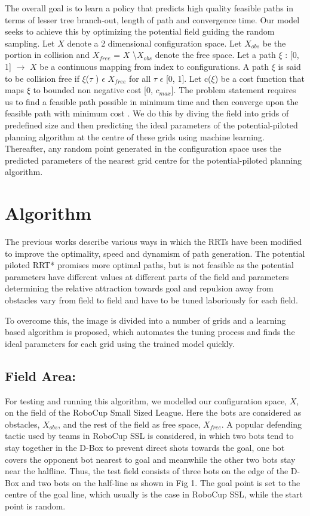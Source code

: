 \documentclass[runningheads]{llncs}
\begin{document}
The overall goal is to learn a policy that predicts high quality feasible paths in terms of lesser tree branch-out, length of path and convergence time. Our model seeks to achieve this by optimizing the potential field guiding the random sampling. Let $X$ denote a 2 dimensional configuration space. Let
$X_{obs}$ be the portion in collision and $X_{free}$ = $X$ \textbackslash $X_{obs}$ denote
the free space. Let a path {$\xi$} : [0, 1] {$\rightarrow$} $X$ be a continuous mapping from index to configurations. A path {$\xi$} is said to be collision free if {$\xi$}({$\tau$} ) $\epsilon$ $X_{free}$ for all {$\tau$} $\epsilon$ [0, 1]. Let c($\xi$) be a cost function that maps $\xi$ to bounded non negative cost [0, $c_{max}$]. The problem statement requires us to find a feasible path possible in minimum time and then converge upon the feasible path with minimum cost . We do this by diving the field into grids of predefined size and then predicting the ideal parameters of the potential-piloted planning algorithm at the centre of these grids using machine learning. Thereafter, any random point generated in the configuration space uses the predicted parameters of the nearest grid centre for the potential-piloted planning algorithm. 

\section{{Algorithm}}
\vspace{-1mm}

The previous works describe various ways in which the RRTs have been modified to improve the optimality, speed and dynamism of path generation. The potential piloted RRT* promises more optimal paths, but is not feasible as the potential parameters have different values at different parts of the field and parameters determining the relative attraction towards goal and repulsion away from obstacles vary from field to field and have to be tuned laboriously for each field. 

To overcome this, the image is divided into a number of grids and a learning based algorithm is proposed, which automates the tuning process and finds the ideal parameters for each grid using the trained model quickly.

\subsection{Field Area:}

For testing and running this algorithm, we modelled our configuration space, $X$, on the field of the RoboCup Small Sized League. Here the bots are considered as obstacles, $X_{obs}$, and  the rest of the field as free space, $X_{free}$. A popular defending tactic used by teams in RoboCup SSL is considered, in which two bots tend to stay together in the D-Box to prevent direct shots towards the goal, one bot covers the opponent bot nearest to goal and meanwhile the other two bots stay near the halfline. Thus, the test field consists of three bots on the edge of the D-Box and two bots on the half-line as shown in Fig 1. The goal point is set to the centre of the goal line, which usually is the case in RoboCup SSL, while the start point is random.
\end{document}
